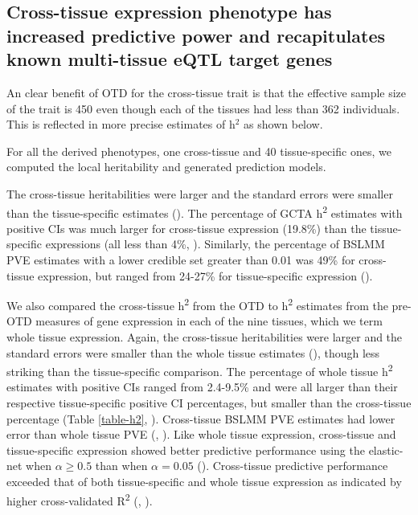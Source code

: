 \documentclass[10pt,letterpaper]{article}
\begin{document}
\subsection*{Cross-tissue expression phenotype has increased predictive
power and recapitulates known multi-tissue eQTL target
genes}\label{cross-tissue-expression-phenotype-has-increased-predictive-power-and-recapitulates-known-multi-tissue-eqtl-target-genes}


An clear benefit of OTD for the cross-tissue trait is that the effective sample size of the trait is 450 even though each of the tissues had less than 362 individuals. This is reflected in more precise estimates of h$^2$ as shown below.

For all the derived phenotypes, one cross-tissue and 40 tissue-specific ones, we computed the local heritability and generated prediction models.

The cross-tissue heritabilities were larger and the standard errors were smaller than the tissue-specific estimates (). The percentage of GCTA h\textsuperscript{2} estimates with positive CIs was much larger for cross-tissue expression (19.8\%) than the tissue-specific expressions (all less than 4\%, ). Similarly, the percentage of BSLMM PVE estimates with a lower credible set greater than 0.01 was 49\% for cross-tissue expression, but ranged from 24-27\% for tissue-specific expression ().

We also compared the cross-tissue h\textsuperscript{2} from the OTD to h\textsuperscript{2} estimates from the pre-OTD measures of gene expression in each of the nine tissues, which we term whole tissue expression. Again, the cross-tissue heritabilities were larger and the standard errors were smaller than the whole tissue estimates (), though less striking than the tissue-specific comparison. The percentage of whole tissue h\textsuperscript{2} estimates with positive CIs ranged from 2.4-9.5\% and were all larger than their respective tissue-specific positive CI percentages, but smaller than the cross-tissue percentage (Table \ref{table-h2}, ). Cross-tissue BSLMM PVE estimates had lower error than whole tissue PVE (, ). Like whole tissue expression, cross-tissue and tissue-specific expression showed better predictive performance using the elastic-net when \(\alpha \geq 0.5\) than when \(\alpha=0.05\) (). Cross-tissue predictive performance exceeded that of both tissue-specific and whole tissue expression as indicated by higher cross-validated R\textsuperscript{2} (, ).
\end{document}
